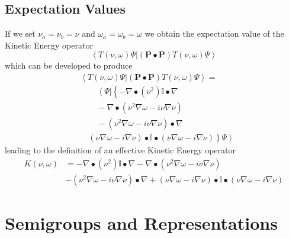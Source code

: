 \documentclass[aps,preprint]{revtex4}%
\begin{document}
\begin{description}
\end{description}

\subsection{Expectation Values}

If we set $\nu_{a}=\nu_{b}=\nu$ and $\omega_{a}=\omega_{b}=\omega$ we obtain
the expectation value of the Kinetic Energy operator
\begin{equation}
\left\langle T\left(  \nu,\omega\right)  \Psi|\left(  \mathbf{P\bullet
P}\right)  T\left(  \nu,\omega\right)  \Psi\right\rangle
\end{equation}
which can be developed to produce
\begin{align}
&  \left\langle T\left(  \nu,\omega\right)  \Psi|\left(  \mathbf{P\bullet
P}\right)  T\left(  \nu,\omega\right)  \Psi\right\rangle =\nonumber\\
&  \qquad\left\langle \Psi\right.  |\left\{  -\nabla\bullet\left(  \nu
^{2}\right)  \mathbb{I}\bullet\nabla\right. \nonumber\\
&  \qquad-\nabla\bullet\left(  \nu^{2}\nabla\omega-i\nu\nabla\nu\right)
\nonumber\\
&  \qquad-\left(  \nu^{2}\nabla\omega-i\nu\nabla\nu\right)  \bullet
\nabla\nonumber\\
&  \quad\left.  \left(  \nu\nabla\omega-i\nabla\nu\right)  \bullet
\mathbb{I}\bullet\left(  \nu\nabla\omega-i\nabla\nu\right)  \right\}  \left.
\Psi\right\rangle
\end{align}
leading to the definition of an effective Kinetic Energy operator
\begin{align}
K\left(  \nu,\omega\right)   &  =-\nabla\bullet\left(  \nu^{2}\right)
\mathbb{I}\bullet\nabla-\nabla\bullet\left(  \nu^{2}\nabla\omega-i\nu\nabla
\nu\right) \nonumber\\
&  -\left(  \nu^{2}\nabla\omega-i\nu\nabla\nu\right)  \bullet\nabla+\left(
\nu\nabla\omega-i\nabla\nu\right)  \bullet\mathbb{I}\bullet\left(  \nu
\nabla\omega-i\nabla\nu\right)
\end{align}


\section{Semigroups and Representations\label{Groups}}
\end{document}
